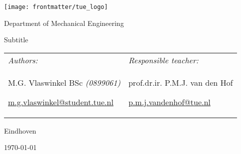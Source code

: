 \makeatletter
\begin{titlepage}
    \begin{center}
        \texttt{[image: frontmatter/tue\_logo]}\par
        \vspace{1.5em}
        {\sffamily \Large Department of Mechanical Engineering \par}
        \vspace{1.5em}
        { \par {\huge Subtitle}}
    \end{center}

    \vfill

    \begin{table}[H]
      \centering
        \begin{tabular}{>{\raggedright\arraybackslash}p{} >{\raggedleft\arraybackslash}p{}}
          \large\textit{Authors:}\vspace{.75em} &  \large\textit{Responsible teacher:}\vspace{.75em} \\

          M.G. Vlaswinkel BSc \emph{(0899061)}\par
          \href{mailto:m.g.vlaswinkel@student.tue.nl}{m.g.vlaswinkel@student.tue.nl}
          &

          prof.dr.ir. P.M.J. van den Hof \par
          \href{mailto:p.m.j.vandenhof@tue.nl}{p.m.j.vandenhof@tue.nl}
        \end{tabular}
     \end{table}

    \begin{center}
        {\large Eindhoven\par}\vspace{-\parskip}
        {\large \today\par}
    \end{center}
\end{titlepage}
